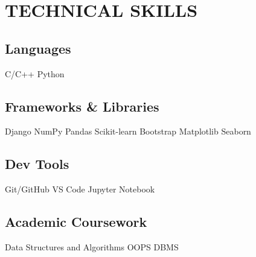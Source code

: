 \documentclass[12pt]{article}
\newcommand{\sbullet}{\raisebox{0.35ex}{\tiny$\bullet$}\hspace*{3pt}}
\begin{document}
\section*{TECHNICAL SKILLS}
\subsection*{Languages}               \hspace*{4.4cm} C/C++ \sbullet Python \\
\subsection*{Frameworks \& Libraries} \hspace*{1.74cm} Django \sbullet NumPy \sbullet Pandas \sbullet Scikit-learn \sbullet Bootstrap \sbullet Matplotlib \sbullet Seaborn\\
\subsection*{Dev Tools}               \hspace*{4.45cm} Git/GitHub \sbullet VS Code \sbullet Jupyter Notebook \\ 
\subsection*{Academic Coursework}     \hspace*{2.10cm} Data Structures and Algorithms \sbullet OOPS \sbullet DBMS \\
\end{document}

